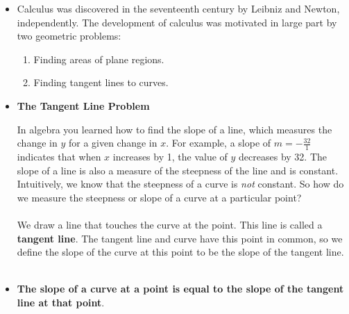 \documentclass[handout]{ximera}  %
\begin{document}




\begin{itemize}
    \item Calculus was discovered in the seventeenth century by
    Leibniz and Newton, independently.  The development of calculus was
    motivated in large part by two geometric problems: 
    
    \begin{enumerate}
    \item Finding areas of plane regions.
    
    \item Finding tangent lines to curves.
    \end{enumerate}
    
    
    \vspace{0.1in}
    \item \textbf{The Tangent Line Problem}
    
    In algebra you learned how to find the slope of a line, which
    measures the change in $y$ for a given change in $x.$ For example,
    a slope of $m=-\frac{32}{1}$ indicates that when $x$ increases by
    1, the value of $y$ decreases by 32. The slope of a line is also a
    measure of the steepness of the line and is constant. Intuitively,
    we know that the steepness of a curve is \emph{not} constant.  So
    how do we measure the steepness or slope of a curve at a
    particular point? \\ \\ 
    
    \vspace{0.1in} We draw a line that touches the curve at the point.
    This line is called a \textbf{tangent line}. The tangent line and
    curve have this point in common, so we define the slope of the
    curve at this point to be the slope of the tangent line. \\ \\
    
    \vspace{0.2in} 
    \item[]\textbf{The slope of a curve at  a point is equal to the slope of the tangent line at that point}. \\  \\
    


\end{itemize}
\end{document}
